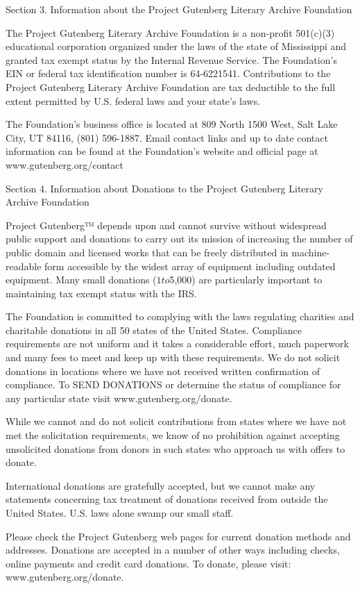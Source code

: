 Section 3. Information about the Project Gutenberg Literary Archive Foundation

The Project Gutenberg Literary Archive Foundation is a non-profit
501(c)(3) educational corporation organized under the laws of the
state of Mississippi and granted tax exempt status by the Internal
Revenue Service. The Foundation’s EIN or federal tax identification
number is 64-6221541. Contributions to the Project Gutenberg Literary
Archive Foundation are tax deductible to the full extent permitted by
U.S. federal laws and your state’s laws.

The Foundation’s business office is located at 809 North 1500 West,
Salt Lake City, UT 84116, (801) 596-1887. Email contact links and up
to date contact information can be found at the Foundation’s website
and official page at www.gutenberg.org/contact

Section 4. Information about Donations to the Project Gutenberg
Literary Archive Foundation

Project Gutenberg™ depends upon and cannot survive without widespread
public support and donations to carry out its mission of
increasing the number of public domain and licensed works that can be
freely distributed in machine-readable form accessible by the widest
array of equipment including outdated equipment. Many small donations
($1 to $5,000) are particularly important to maintaining tax exempt
status with the IRS.

The Foundation is committed to complying with the laws regulating
charities and charitable donations in all 50 states of the United
States. Compliance requirements are not uniform and it takes a
considerable effort, much paperwork and many fees to meet and keep up
with these requirements. We do not solicit donations in locations
where we have not received written confirmation of compliance. To SEND
DONATIONS or determine the status of compliance for any particular state
visit www.gutenberg.org/donate.

While we cannot and do not solicit contributions from states where we
have not met the solicitation requirements, we know of no prohibition
against accepting unsolicited donations from donors in such states who
approach us with offers to donate.

International donations are gratefully accepted, but we cannot make
any statements concerning tax treatment of donations received from
outside the United States. U.S. laws alone swamp our small staff.

Please check the Project Gutenberg web pages for current donation
methods and addresses. Donations are accepted in a number of other
ways including checks, online payments and credit card donations. To
donate, please visit: www.gutenberg.org/donate.

